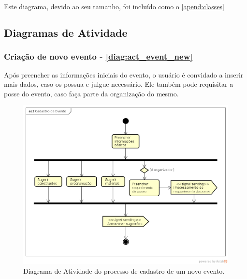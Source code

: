 \documentclass[12pt,a4paper,twoside,hyphens,english,brazil]{abntex2}
\begin{document}
{Este diagrama, devido ao seu tamanho, foi incluído como o \autoref{apend:classes}

\subsection{Diagramas de Atividade}

\subsubsection*{Criação de novo evento - \autoref{diag:act_event_new}}
Após preencher as informações iniciais do evento, o usuário é convidado a inserir mais dados, caso os possua e julgue necessário. Ele também pode requisitar a posse do evento, caso faça parte da organização do mesmo.

\begin{figure}
	\centering
	\includegraphics[width=1\linewidth]{diagramas/comuns/act_event_new.png}
	\caption{Diagrama de Atividade do processo de cadastro de um novo evento.}
	\label{diag:act_event_new}
\end{figure}

}
\end{document}
